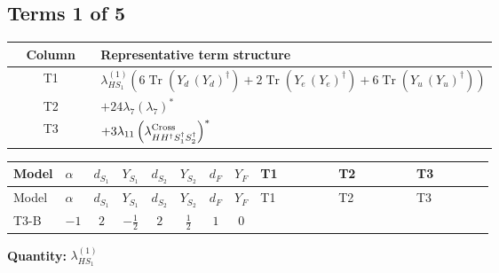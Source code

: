 \documentclass[8pt]{article}
\begin{document}
\begin{landscape}
\subsection*{Terms 1 of 5}
\begin{center}
\begin{tabular}{@{}c >{\raggedright\arraybackslash}p{0.82\linewidth}@{}}
\toprule
Column & Representative term structure \\
\midrule
T1 & \(\displaystyle {\lambda_{HS_1}^{(1)}} (6 \operatorname{Tr}\!\left({Y_d}\,\left({Y_d}\right)^{\dagger}\right)+2 \operatorname{Tr}\!\left({Y_e}\,\left({Y_e}\right)^{\dagger}\right)+6 \operatorname{Tr}\!\left({Y_u}\,\left({Y_u}\right)^{\dagger}\right))\) \\
\midrule
T2 & \(\displaystyle +24 {\lambda_{7}} \left({\lambda_{7}}\right)^{*}\) \\
\midrule
T3 & \(\displaystyle +3 {\lambda_{11}} \left({\lambda_{H H^\dagger S_1^\dagger S_2^\dagger}^{\rm Cross}}\right)^{*}\) \\
\midrule
\bottomrule
\end{tabular}
\end{center}
\smallskip
\tiny
\begin{longtable}{@{}llcccccc >{\raggedright\arraybackslash}p{0.21\linewidth} >{\raggedright\arraybackslash}p{0.21\linewidth} >{\raggedright\arraybackslash}p{0.21\linewidth}@{}}
\toprule
Model & $\alpha$ & $d_{S_1}$ & $Y_{S_1}$ & $d_{S_2}$ & $Y_{S_2}$ & $d_F$ & $Y_F$ & T1 & T2 & T3 \\
\midrule
\endfirsthead
\toprule
Model & $\alpha$ & $d_{S_1}$ & $Y_{S_1}$ & $d_{S_2}$ & $Y_{S_2}$ & $d_F$ & $Y_F$ & T1 & T2 & T3 \\
\midrule
\endhead
T3-B & $-1$ & $2$ & $-\frac{1}{2}$ & $2$ & $\frac{1}{2}$ & $1$ & $0$ & \scriptsize\adjustbox{max width=\linewidth}{$\begin{gathered} {\lambda_{HS_1}^{(1)}} (6 \operatorname{Tr}\!\left({Y_d}\,\left({Y_d}\right)^{\dagger}\right)+2 \operatorname{Tr}\!\left({Y_e}\,\left({Y_e}\right)^{\dagger}\right)+6 \operatorname{Tr}\!\left({Y_u}\,\left({Y_u}\right)^{\dagger}\right))\end{gathered}$} & \scriptsize\adjustbox{max width=\linewidth}{$\begin{gathered} +24 {\lambda_{7}} \left({\lambda_{7}}\right)^{*}\end{gathered}$} & \scriptsize\adjustbox{max width=\linewidth}{$\begin{gathered} +3 {\lambda_{11}} \left({\lambda_{H H^\dagger S_1^\dagger S_2^\dagger}^{\rm Cross}}\right)^{*}\end{gathered}$} \\
\midrule
\bottomrule
\end{longtable}
\clearpage
\noindent\textbf{Quantity: }$\lambda_{HS_1}^{(1)}$\par\smallskip

\end{landscape}
\end{document}
